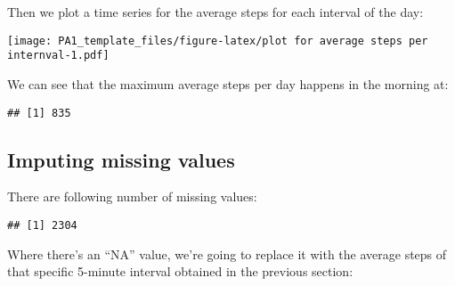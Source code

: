 \documentclass[]{article}
\newenvironment{Shaded}{\begin{snugshade}}{\end{snugshade}}
\newcommand{\KeywordTok}[1]{\textcolor[rgb]{0.13,0.29,0.53}{\textbf{#1}}}
\newcommand{\DataTypeTok}[1]{\textcolor[rgb]{0.13,0.29,0.53}{#1}}
\newcommand{\StringTok}[1]{\textcolor[rgb]{0.31,0.60,0.02}{#1}}
\newcommand{\OperatorTok}[1]{\textcolor[rgb]{0.81,0.36,0.00}{\textbf{#1}}}
\newcommand{\NormalTok}[1]{#1}
\begin{document}
Then we plot a time series for the average steps for each interval of
the day:

\begin{Shaded}
\end{Shaded}

\texttt{[image: PA1\_template\_files/figure-latex/plot for average steps per internval-1.pdf]}

We can see that the maximum average steps per day happens in the morning
at:

\begin{Shaded}
\end{Shaded}

\begin{verbatim}
## [1] 835
\end{verbatim}

\subsection{Imputing missing values}\label{imputing-missing-values}

There are following number of missing values:

\begin{Shaded}
\end{Shaded}

\begin{verbatim}
## [1] 2304
\end{verbatim}

Where there's an ``NA'' value, we're going to replace it with the
average steps of that specific 5-minute interval obtained in the
previous section:
\end{document}
